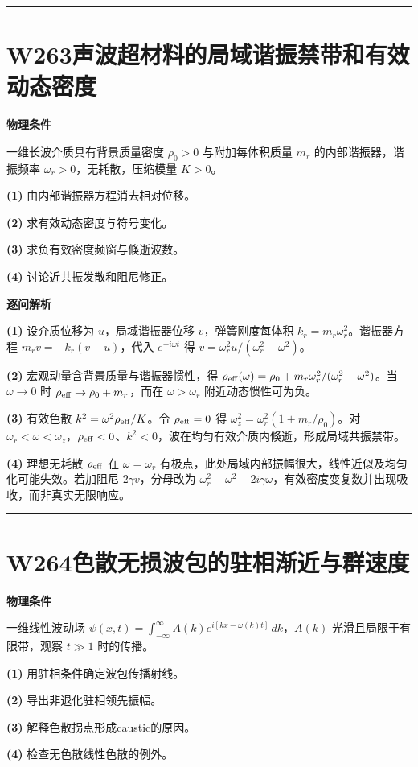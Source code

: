 \documentclass[UTF8,a4paper,11pt,oneside,openany]{ctexbook}
\begin{document}
\par\bigskip\hrule\bigskip
\section*{W263\quad 声波超材料的局域谐振禁带和有效动态密度}
\textbf{物理条件}\par 一维长波介质具有背景质量密度 \(\rho_0>0\) 与附加每体积质量 \(m_r\) 的内部谐振器，谐振频率 \(\omega_r>0\)，无耗散，压缩模量 \(K>0\)。
\par\noindent\textbf{(1)} 由内部谐振器方程消去相对位移。
\par\noindent\textbf{(2)} 求有效动态密度与符号变化。
\par\noindent\textbf{(3)} 求负有效密度频窗与倏逝波数。
\par\noindent\textbf{(4)} 讨论近共振发散和阻尼修正。

\par\medskip\noindent\textbf{逐问解析}
\par\noindent\textbf{(1)} 设介质位移为 \(u\)，局域谐振器位移 \(v\)，弹簧刚度每体积 \(k_r=m_r\omega_r^2\)。谐振器方程 \(m_r\ddot v=-k_r(v-u)\)，代入 \(e^{-i\omega t}\) 得 \(v=\omega_r^2u/(\omega_r^2-\omega^2)\)。
\par\noindent\textbf{(2)} 宏观动量含背景质量与谐振器惯性，得 \(\rho_{\rm eff}(\omega)=\rho_0+m_r\omega_r^2/(\omega_r^2-\omega^2)\)。当 \(\omega\to0\) 时 \(\rho_{\rm eff}\to\rho_0+m_r\)，而在 \(\omega>\omega_r\) 附近动态惯性可为负。
\par\noindent\textbf{(3)} 有效色散 \(k^2=\omega^2\rho_{\rm eff}/K\)。令 \(\rho_{\rm eff}=0\) 得 \(\omega_z^2=\omega_r^2(1+m_r/\rho_0)\)。对 \(\omega_r<\omega<\omega_z\)，\(\rho_{\rm eff}<0\)、\(k^2<0\)，波在均匀有效介质内倏逝，形成局域共振禁带。
\par\noindent\textbf{(4)} 理想无耗散 \(\rho_{\rm eff}\) 在 \(\omega=\omega_r\) 有极点，此处局域内部振幅很大，线性近似及均匀化可能失效。若加阻尼 \(2\gamma\dot v\)，分母改为 \(\omega_r^2-\omega^2-2i\gamma\omega\)，有效密度变复数并出现吸收，而非真实无限响应。

\par\bigskip\hrule\bigskip
\section*{W264\quad 色散无损波包的驻相渐近与群速度}
\textbf{物理条件}\par 一维线性波动场 \(\psi(x,t)=\int_{-\infty}^\infty A(k)e^{i[kx-\omega(k)t]}\,dk\)，\(A(k)\) 光滑且局限于有限带，观察 \(t\gg1\) 时的传播。
\par\noindent\textbf{(1)} 用驻相条件确定波包传播射线。
\par\noindent\textbf{(2)} 导出非退化驻相领先振幅。
\par\noindent\textbf{(3)} 解释色散拐点形成caustic的原因。
\par\noindent\textbf{(4)} 检查无色散线性色散的例外。
\end{document}
